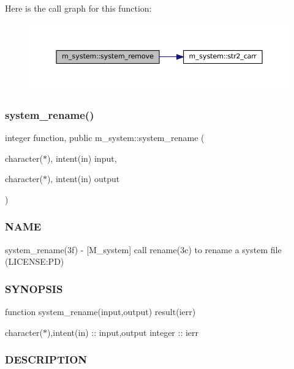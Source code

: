 Here is the call graph for this function\+:\nopagebreak
\begin{figure}[H]
\begin{center}
\leavevmode
\includegraphics[width=350pt]{namespacem__system_a7fa10b991ae066609b687423918cff52_cgraph}
\end{center}
\end{figure}
\mbox{\label{namespacem__system_adfbaf3d17790da9ba0c520683d5b8003}} 
\subsubsection{\texorpdfstring{system\+\_\+rename()}{system\_rename()}}
{\footnotesize\ttfamily integer function, public m\+\_\+system\+::system\+\_\+rename (\begin{DoxyParamCaption}\item[{character($\ast$), intent(in)}]{input,  }\item[{character($\ast$), intent(in)}]{output }\end{DoxyParamCaption})}



\subsubsection*{N\+A\+ME}

system\+\_\+rename(3f) -\/ \mbox{[}M\+\_\+system\mbox{]} call rename(3c) to rename a system file (L\+I\+C\+E\+N\+SE\+:PD) \subsubsection*{S\+Y\+N\+O\+P\+S\+IS}

function system\+\_\+rename(input,output) result(ierr)

character($\ast$),intent(in) \+:\+: input,output integer \+:\+: ierr \subsubsection*{D\+E\+S\+C\+R\+I\+P\+T\+I\+ON}

